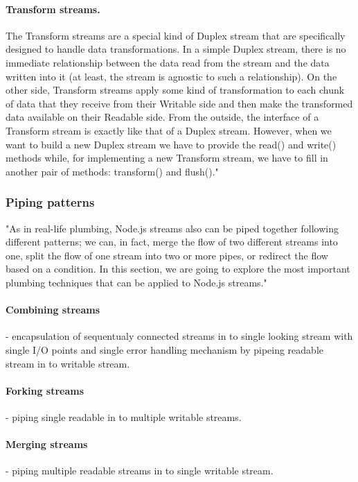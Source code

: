 \documentclass{llncs}
\begin{document}
\paragraph{Transform streams.}
The Transform streams are a special kind of Duplex stream that are specifically designed to handle data transformations.
In a simple Duplex stream, there is no immediate relationship between the data read from the stream and the data written into it (at least, the stream is agnostic to such a relationship).
On the other side, Transform streams apply some kind of transformation to each chunk of data that they receive from their Writable side and then make the transformed data available on their Readable side.
From the outside, the interface of a Transform stream is exactly like that of a Duplex stream.
However, when we want to build a new Duplex stream we have to provide the read() and write() methods while, for implementing a new Transform stream, we have to fill in another pair of methods: transform() and flush()."\cite{nodejsbook}


\subsubsection{Piping patterns}
"As in real-life plumbing, Node.js streams also can be piped together following different patterns; we can, in fact, merge the flow of two different streams into one, split the flow of one stream into two or more pipes, or redirect the flow based on a condition. 
In this section, we are going to explore the most important plumbing techniques that can be applied to Node.js streams."\cite{nodejsbook}

\paragraph{Combining streams} - encapsulation of sequentualy connected streams in to single looking stream with single I/O points and single error handling mechanism by pipeing readable stream in to writable stream.\cite{nodejsbook}
\paragraph{Forking streams} - piping single readable in to multiple writable streams.\cite{nodejsbook}
\paragraph{Merging streams} - piping multiple readable streams in to single writable stream.\cite{nodejsbook}
\end{document}
